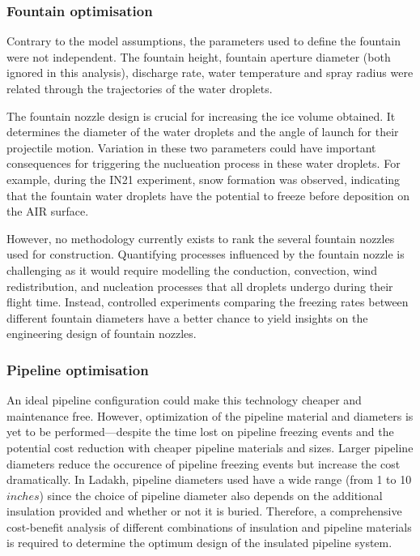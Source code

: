 \documentclass[tc, manuscript]{copernicus}
\begin{document}
\subsubsection{Fountain optimisation}

Contrary to the model assumptions, the parameters used to define the fountain were not independent. The fountain
height, fountain aperture diameter (both ignored in this analysis), discharge rate, water temperature and spray
radius were related through the trajectories of the water droplets.

The fountain nozzle design is crucial for increasing the ice volume obtained. It determines the diameter of the
water droplets and the angle of launch for their projectile motion. Variation in these two parameters could have
important consequences for triggering the nuclueation process in these water droplets. For example, during the IN21
experiment, snow formation was observed, indicating that the fountain water droplets have the potential to
freeze before deposition on the AIR surface. 

However, no methodology currently exists to rank the several fountain nozzles used for construction. Quantifying
processes influenced by the fountain nozzle is challenging as it would require modelling the conduction,
convection, wind redistribution, and nucleation processes that all droplets undergo during their flight time.
Instead, controlled experiments comparing the freezing rates between different fountain diameters have a better
chance to yield insights on the engineering design of fountain nozzles.

\subsubsection{Pipeline optimisation}

An ideal pipeline configuration could make this technology cheaper and maintenance free. However, optimization
of the pipeline material and diameters is yet to be performed---despite the time lost on pipeline freezing
events and the potential cost reduction with cheaper pipeline materials and sizes. Larger pipeline diameters
reduce the occurence of pipeline freezing events but increase the cost dramatically. In Ladakh, pipeline
diameters used have a wide range (from 1 to 10 $inches$) since the choice of pipeline diameter also depends on
the additional insulation provided and whether or not it is buried. Therefore, a comprehensive cost-benefit
analysis of different combinations of insulation and pipeline materials is required to determine the optimum
design of the insulated pipeline system.  
\end{document}
